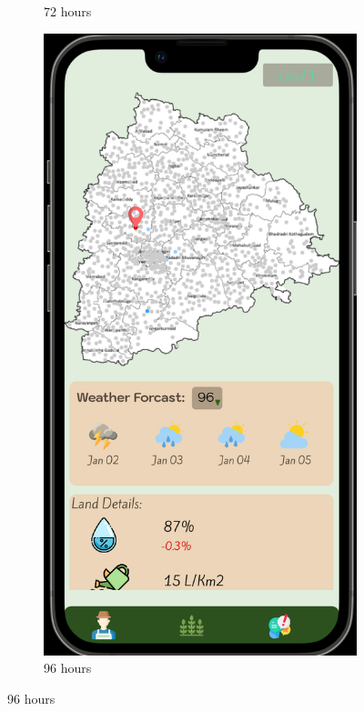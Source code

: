 \begin{figure}[ht]
\begin{subfigure}[b]{0.6\linewidth}
    \caption{72 hours} 
    \label{fig:b} 
    \vspace{4ex}
  \end{subfigure} 
  \begin{subfigure}[b]{0.6\linewidth}
    \centering
    \includegraphics[width=0.6\linewidth]{figures/forcastchange5.png} 
    \caption{96 hours} 
    \label{fig:b} 
    \vspace{4ex}
  \end{subfigure} 
  
  \label{fig:example_many_images} 
\end{figure}
\clearpage

    
